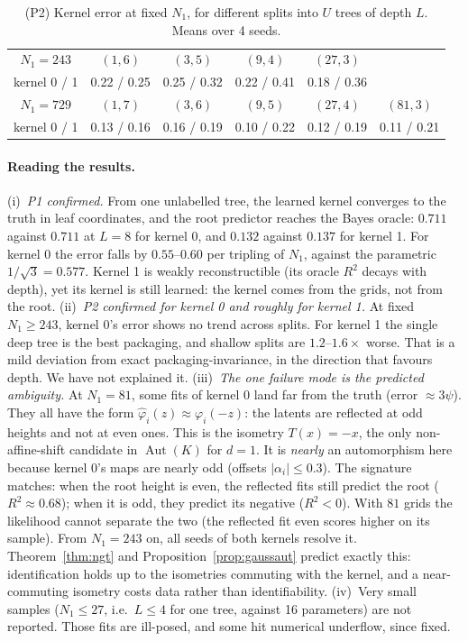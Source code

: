 \documentclass[11pt]{article}
\theoremstyle{definition}
\begin{document}
\begin{table}[h]\centering
\caption{(P2) Kernel error at fixed $N_1$, for different splits into $U$ trees of depth $L$. Means over 4
seeds.}\label{tab:v1p2}
\small\begin{tabular}{c|ccccc}\toprule
$N_1=243$ & $(1,6)$ & $(3,5)$ & $(9,4)$ & $(27,3)$ &\\
kernel 0 / 1 & 0.22 / 0.25 & 0.25 / 0.32 & 0.22 / 0.41 & 0.18 / 0.36 &\\\midrule
$N_1=729$ & $(1,7)$ & $(3,6)$ & $(9,5)$ & $(27,4)$ & $(81,3)$\\
kernel 0 / 1 & 0.13 / 0.16 & 0.16 / 0.19 & 0.10 / 0.22 & 0.12 / 0.19 & 0.11 / 0.21\\
\bottomrule\end{tabular}
\end{table}

\paragraph{Reading the results.}
(i)~\emph{P1 confirmed.} From one unlabelled tree, the learned kernel converges to the truth in leaf
coordinates, and the root predictor reaches the Bayes oracle: $0.711$ against $0.711$ at $L=8$ for
kernel 0, and $0.132$ against $0.137$ for kernel 1. For kernel 0 the error falls by $0.55$--$0.60$ per
tripling of $N_1$, against the parametric $1/\sqrt3=0.577$. Kernel 1 is weakly reconstructible (its
oracle $R^2$ decays with depth), yet its kernel is still learned: the kernel comes from the grids, not
from the root.
(ii)~\emph{P2 confirmed for kernel 0 and roughly for kernel 1.} At fixed $N_1\ge243$, kernel 0's error
shows no trend across splits. For kernel 1 the single deep tree is the best packaging, and shallow
splits are $1.2$--$1.6\times$ worse. That is a mild deviation from exact packaging-invariance, in the
direction that favours depth. We have not explained it.
(iii)~\emph{The one failure mode is the predicted ambiguity.} At $N_1=81$, some fits of kernel 0 land far
from the truth (error $\approx3\psi$). They all have the form $\hat\varphi_i(z)\approx\varphi_i(-z)$: the
latents are reflected at odd heights and not at even ones. This is the isometry $T(x)=-x$, the only
non-affine-shift candidate in $\operatorname{Aut}(K)$ for $d=1$. It is \emph{nearly} an automorphism
here because kernel 0's maps are nearly odd (offsets $|\alpha_i|\le0.3$). The signature matches: when
the root height is even, the reflected fits still predict the root ($R^2\approx0.68$); when it is odd,
they predict its negative ($R^2<0$). With $81$ grids the likelihood cannot separate the two (the
reflected fit even scores higher on its sample). From $N_1=243$ on, all seeds of both kernels resolve
it. Theorem~\ref{thm:ngt} and Proposition~\ref{prop:gaussaut} predict exactly this: identification
holds up to the isometries commuting with the kernel, and a near-commuting isometry costs data rather
than identifiability.
(iv)~Very small samples ($N_1\le27$, i.e.\ $L\le4$ for one tree, against 16 parameters) are not
reported. Those fits are ill-posed, and some hit numerical underflow, since fixed.
\end{document}
